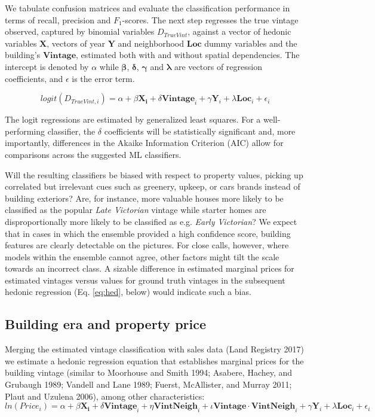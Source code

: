\documentclass[]{article}
\begin{document}
We tabulate confusion matrices and evaluate the classification
performance in terms of recall, precision and \(F_1\)-scores. The next
step regresses the true vintage observed, captured by binomial variables
\(D_{TrueVint}\), against a vector of hedonic variables \(\mathbf{X}\),
vectors of year \(\mathbf{Y}\) and neighborhood \(\bm{Loc}\) dummy
variables and the building's \(\mathbf{Vintage}\), estimated both with
and without spatial dependencies. The intercept is denoted by \(\alpha\)
while \(\bm{\beta}\), \(\bm{\delta}\), \(\bm{\gamma}\) and
\(\bm{\lambda}\) are vectors of regression coefficients, and
\(\epsilon\) is the error term.

\begin{equation} \label{eq:rev}
  logit( D_{TrueVint,i} ) = \alpha + \beta\mathbf{X_i} + \delta\mathbf{Vintage}_i +  \gamma\mathbf{Y}_i + \lambda\mathbf{Loc}_i +  \epsilon_i
\end{equation}

The logit regressions are estimated by generalized least squares. For a
well-performing classifier, the \(\delta\) coefficients will be
statistically significant and, more importantly, differences in the
Akaike Information Criterion (AIC) allow for comparisons across the
suggested ML classifiers.

Will the resulting classifiers be biased with respect to property
values, picking up correlated but irrelevant cues such as greenery,
upkeep, or cars brands instead of building exteriors? Are, for instance,
more valuable houses more likely to be classified as the popular
\emph{Late Victorian} vintage while starter homes are disproportionally
more likely to be classified as e.g. \emph{Early Victorian}? We expect
that in cases in which the ensemble provided a high confidence score,
building features are clearly detectable on the pictures. For close
calls, however, where models within the ensemble cannot agree, other
factors might tilt the scale towards an incorrect class. A sizable
difference in estimated marginal prices for estimated vintages versus
values for ground truth vintages in the subsequent hedonic regression
(Eq. \ref{eq:hed}, below) would indicate such a bias.

\hypertarget{building-era-and-property-price}{%
\subsection{Building era and property
price}\label{building-era-and-property-price}}

Merging the estimated vintage classification with sales data (Land
Registry 2017) we estimate a hedonic regression equation that
establishes marginal prices for the building vintage (similar to
Moorhouse and Smith 1994; Asabere, Hachey, and Grubaugh 1989; Vandell
and Lane 1989; Fuerst, McAllister, and Murray 2011; Plaut and Uzulena
2006), among other characteristics: \begin{equation} \label{eq:hed}
  ln(Price_i) = \alpha + \beta\mathbf{X_i} + \delta\mathbf{Vintage}_i + \eta\mathbf{VintNeigh}_i + \iota\mathbf{Vintage\cdot VintNeigh}_i  +\gamma\mathbf{Y}_i + \lambda\mathbf{Loc}_i +  \epsilon_i
\end{equation}
\end{document}

